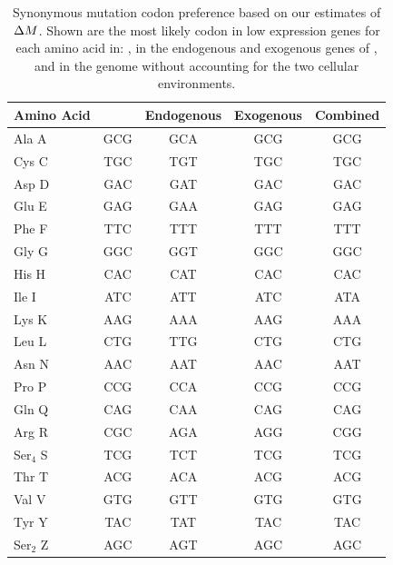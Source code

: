 \documentclass[fleqn,letterpaper]{article}
\begin{document}
\begin{table}[h]
    \centering
    \caption{Synonymous mutation codon preference based on our estimates of ${\Delta M}$.
	 Shown are the most likely codon in low expression genes for each amino acid in: \gossypii, in the endogenous and exogenous genes of \kluyveri, and in the \kluyveri genome without accounting for the two cellular environments.}
\begin{tabular}{  l  c  c  c  c  }
\hline
	Amino Acid & \gossypii & Endogenous & Exogenous & Combined \\ \hline
	Ala A & GCG & GCA & GCG & GCG \\ 
	Cys C & TGC & TGT & TGC & TGC \\ 
	Asp D & GAC & GAT & GAC & GAC \\ 
	Glu E & GAG & GAA & GAG & GAG \\ 
	Phe F & TTC & TTT & TTT & TTT \\ 
	Gly G & GGC & GGT & GGC & GGC \\ 
	His H & CAC & CAT & CAC & CAC \\ 
	Ile I & ATC & ATT & ATC & ATA \\ 
	Lys K & AAG & AAA & AAG & AAA \\ 
	Leu L & CTG & TTG & CTG & CTG \\ 
	Asn N & AAC & AAT & AAC & AAT \\ 
	Pro P & CCG & CCA & CCG & CCG \\ 
	Gln Q & CAG & CAA & CAG & CAG \\ 
	Arg R & CGC & AGA & AGG & CGG \\ 
	Ser$_4$ S & TCG & TCT & TCG & TCG \\
	Thr T & ACG & ACA & ACG & ACG \\ 
	Val V & GTG & GTT & GTG & GTG \\ 
	Tyr Y & TAC & TAT & TAC & TAC \\ 
	Ser$_2$ Z & AGC & AGT & AGC & AGC \\ \hline
\end{tabular}
    \label{tab:codon_pref_dm}
\end{table}

\clearpage
\end{document}
